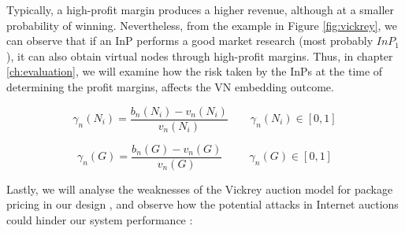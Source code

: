 \begin{itemize}
Typically, a high-profit margin produces a higher revenue, although at a smaller probability of winning. Nevertheless, from the example in Figure \ref{fig:vickrey}, we can observe that if an InP performs a good market research (most probably $InP_1$), it can also obtain virtual nodes through high-profit margins. Thus, in chapter \ref{ch:evaluation}, we will examine how the risk taken by the InPs at the time of determining the profit margins, affects the VN embedding outcome.

\begin{equation} \label{eq:profitmarginNode}
	\gamma_n(N_i) = \frac{b_n(N_i)- v_n(N_i)}{v_n(N_i)} \qquad \gamma_n(N_i) \in [0,1]
  \end{equation}
  
\begin{equation} \label{eq:profitmarginGraph}
  \gamma_n(G) =  \frac{b_n(G)- v_n(G)}{v_n(G)} \qquad \ \  \gamma_n(G) \in [0,1]
\end{equation}
  


\end{itemize}

Lastly, we will analyse the weaknesses of the Vickrey auction model for package pricing in our design \citep{ausubel2006lovely}, and observe how the potential attacks in Internet auctions could hinder our system performance \citep{boyd2000security}:

